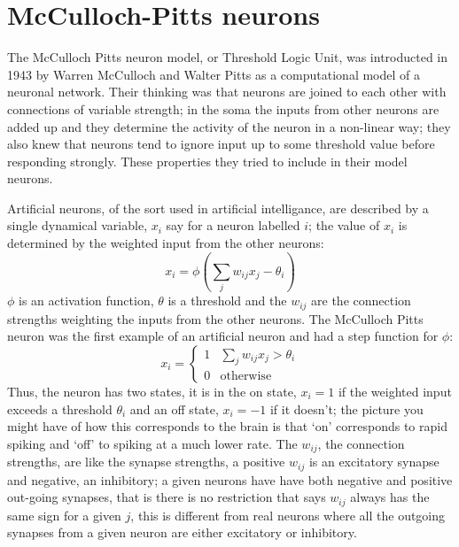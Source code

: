 \documentclass[12pt]{article}
\begin{document}
\section*{McCulloch-Pitts neurons} 

The McCulloch Pitts neuron model, or Threshold Logic Unit, was
introducted in 1943 by Warren McCulloch and Walter Pitts as a
computational model of a neuronal network. Their thinking was that
neurons are joined to each other with connections of variable
strength; in the soma the inputs from other neurons are added up and
they determine the activity of the neuron in a non-linear way; they
also knew that neurons tend to ignore input up to some threshold value
before responding strongly. These properties they tried to include in
their model neurons.

Artificial neurons, of the sort used in artificial intelligance, are
described by a single dynamical variable, $x_i$ say for a neuron
labelled $i$; the value of $x_i$ is determined by the weighted input
from the other neurons:
\begin{equation}
x_i=\phi\left(\sum_j w_{ij} x_j-\theta_i\right)
\end{equation}
$\phi$ is an activation function, $\theta$ is a threshold and the
$w_{ij}$ are the connection strengths weighting the inputs from the
other neurons. The McCulloch Pitts neuron was the first example of an
artificial neuron and had a step function for $\phi$:
\begin{equation}
x_i=\left\{\begin{array}{ll}1&\sum_j w_{ij} x_j>\theta_i\\0&\mbox{otherwise}\end{array}\right.
\end{equation}
Thus, the neuron has two states, it is in the on state, $x_i=1$ if the
weighted input exceeds a threshold $\theta_i$ and an off state,
$x_i=-1$ if it doesn't; the picture you might have of how this
corresponds to the brain is that \lq{}on\rq{} corresponds to rapid
spiking and \lq{}off\rq{} to spiking at a much lower rate. The
$w_{ij}$, the connection strengths, are like the synapse strengths, a
positive $w_{ij}$ is an excitatory synapse and negative, an
inhibitory; a given neurons have have both negative and positive
out-going synapses, that is there is no restriction that says $w_{ij}$
always has the same sign for a given $j$, this is different from real
neurons where all the outgoing synapses from a given neuron are either
excitatory or inhibitory.
\end{document}
